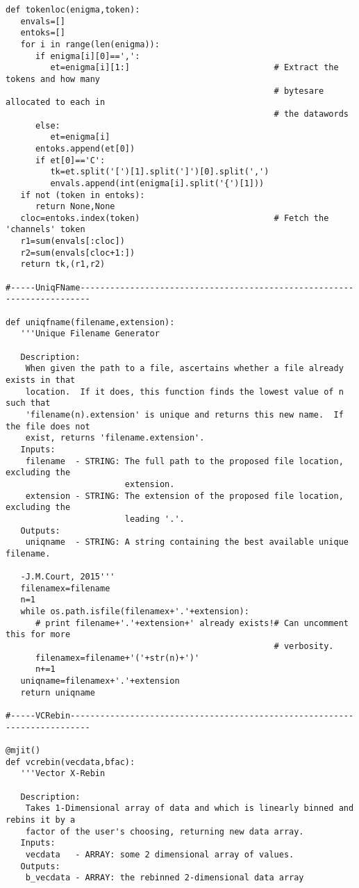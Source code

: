 \begin{verbatim}
def tokenloc(enigma,token):
   envals=[]
   entoks=[]
   for i in range(len(enigma)):
      if enigma[i][0]==',':
         et=enigma[i][1:]                             # Extract the tokens and how many
                                                      # bytesare allocated to each in
                                                      # the datawords
      else:
         et=enigma[i]
      entoks.append(et[0])
      if et[0]=='C':
         tk=et.split('[')[1].split(']')[0].split(',')
         envals.append(int(enigma[i].split('{')[1]))
   if not (token in entoks):
      return None,None
   cloc=entoks.index(token)                           # Fetch the 'channels' token
   r1=sum(envals[:cloc])
   r2=sum(envals[cloc+1:])
   return tk,(r1,r2)

#-----UniqFName------------------------------------------------------------------------

def uniqfname(filename,extension):
   '''Unique Filename Generator

   Description:
    When given the path to a file, ascertains whether a file already exists in that
    location.  If it does, this function finds the lowest value of n such that
    'filename(n).extension' is unique and returns this new name.  If the file does not
    exist, returns 'filename.extension'.
   Inputs:
    filename  - STRING: The full path to the proposed file location, excluding the
                        extension.
    extension - STRING: The extension of the proposed file location, excluding the
                        leading '.'.
   Outputs:
    uniqname  - STRING: A string containing the best available unique filename.

   -J.M.Court, 2015'''
   filenamex=filename
   n=1
   while os.path.isfile(filenamex+'.'+extension):
      # print filename+'.'+extension+' already exists!# Can uncomment this for more
                                                      # verbosity.
      filenamex=filename+'('+str(n)+')'
      n+=1
   uniqname=filenamex+'.'+extension
   return uniqname

#-----VCRebin--------------------------------------------------------------------------

@mjit()
def vcrebin(vecdata,bfac):
   '''Vector X-Rebin

   Description:
    Takes 1-Dimensional array of data and which is linearly binned and rebins it by a
    factor of the user's choosing, returning new data array.
   Inputs:
    vecdata   - ARRAY: some 2 dimensional array of values.
   Outputs:
    b_vecdata - ARRAY: the rebinned 2-dimensional data array


\end{verbatim}
